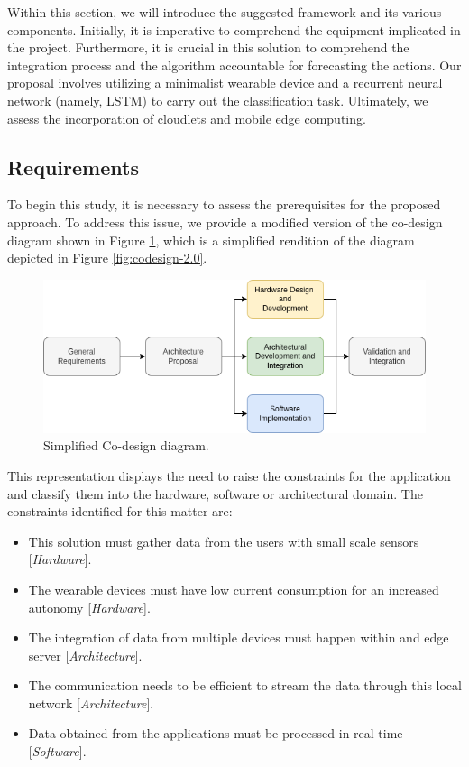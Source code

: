 Within this section, we will introduce the suggested framework and its various components. Initially, it is imperative to comprehend the equipment implicated in the project. Furthermore, it is crucial in this solution to comprehend the integration process and the algorithm accountable for forecasting the actions. Our proposal involves utilizing a minimalist wearable device and a recurrent neural network (namely, LSTM) to carry out the classification task. Ultimately, we assess the incorporation of cloudlets and mobile edge computing.


\subsection{Requirements}

To begin this study, it is necessary to assess the prerequisites for the proposed approach. To address this issue, we provide a modified version of the co-design diagram shown in Figure \ref{fig:simplified-codesign-6}, which is a simplified rendition of the diagram depicted in Figure \ref{fig:codesign-2.0}.

\begin{figure}[ht!]
    \centering
    \includegraphics[width = .8\linewidth]{Figures/simplified-codesign.png}
    \caption{Simplified Co-design diagram.}
    \label{fig:simplified-codesign-6}
\end{figure}

This representation displays the need to raise the constraints for the application and classify them into the hardware, software or architectural domain. The constraints identified for this matter are:

\begin{itemize}
    \item This solution must gather data from the users with small scale sensors [\textit{Hardware}].
    \item The wearable devices must have low current consumption for an increased autonomy [\textit{Hardware}].
    \item The integration of data from multiple devices must happen within and edge server [\textit{Architecture}].
    \item The communication needs to be efficient to stream the data through this local network [\textit{Architecture}].
    \item Data obtained from the applications must be processed in real-time [\textit{Software}].
\end{itemize}

